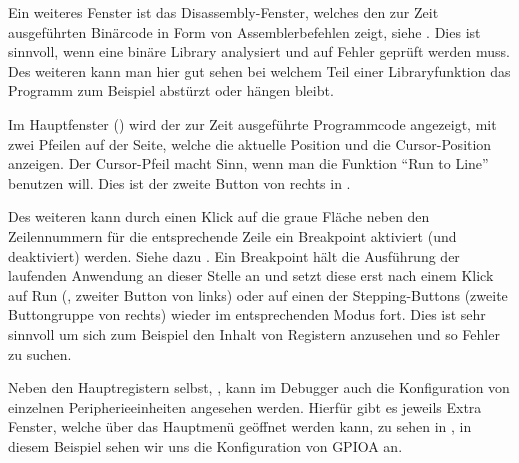 
Ein weiteres Fenster ist das Disassembly-Fenster, welches den zur Zeit ausgeführten Binärcode in Form von Assemblerbefehlen zeigt, siehe . Dies ist sinnvoll, wenn eine binäre Library analysiert und auf Fehler geprüft werden muss. Des weiteren kann man hier gut sehen bei welchem Teil einer Libraryfunktion das Programm zum Beispiel abstürzt oder hängen bleibt.


Im Hauptfenster () wird der zur Zeit ausgeführte Programmcode angezeigt, mit zwei Pfeilen auf der Seite, welche die aktuelle Position und die Cursor-Position anzeigen. Der Cursor-Pfeil macht Sinn, wenn man die Funktion \enquote{Run to Line} benutzen will. Dies ist der zweite Button von rechts in .



Des weiteren kann durch einen Klick auf die graue Fläche neben den Zeilennummern für die entsprechende Zeile ein Breakpoint aktiviert (und deaktiviert) werden. Siehe dazu . Ein Breakpoint hält die Ausführung der laufenden Anwendung an dieser Stelle an und setzt diese erst nach einem Klick auf Run (, zweiter Button von links) oder auf einen der Stepping-Buttons (zweite Buttongruppe von rechts) wieder im entsprechenden Modus fort. Dies ist sehr sinnvoll um sich zum Beispiel den Inhalt von Registern anzusehen und so Fehler zu suchen.


Neben den Hauptregistern selbst, , kann im Debugger auch die Konfiguration von einzelnen Peripherieeinheiten angesehen werden. Hierfür gibt es jeweils Extra Fenster, welche über das Hauptmenü geöffnet werden kann, zu sehen in , in diesem Beispiel sehen wir uns die Konfiguration von GPIOA an.

